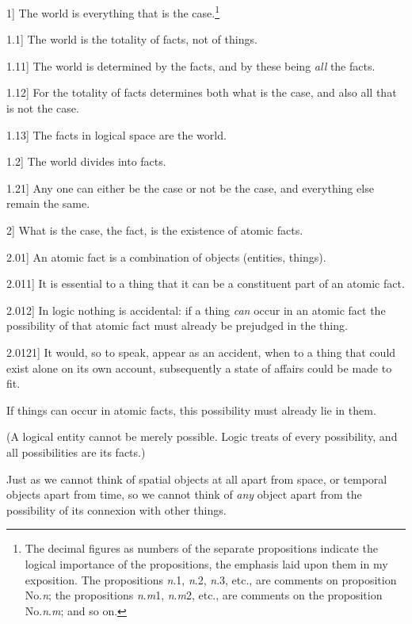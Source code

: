 \documentclass[12pt,oneside]{book}[2007/10/19]
\newcommand{\PropositionE}[2]{%
  \item[\phantomsection\label{PropE:#1}\PropGRef{#1}] #2%
}
\newcommand{\PropGRef}[1]{\hyperref[PropG:#1]{#1}}
\begin{document}
\begin{propositions}
\PropositionE{1}
{The world is everything that is the case.\footnote{The decimal figures as numbers of the separate propositions indicate the logical
importance of the propositions, the emphasis laid upon them in my exposition.
The propositions \textit{n}.1, \textit{n}.2, \textit{n}.3, etc., are comments on proposition No.\;\textit{n}; the propositions
\textit{n}.\textit{m}1, \textit{n}.\textit{m}2, etc., are comments on the proposition No.\;\textit{n}.\textit{m}; and so on.}}


\PropositionE{1.1}
{The world is the totality of facts, not of
things.}


\PropositionE{1.11}
{The world is determined by the facts, and by
these being \emph{all} the facts.}


\PropositionE{1.12}
{For the totality of facts determines both what is
the case, and also all that is not the case.}


\PropositionE{1.13}
{The facts in logical space are the world.}


\PropositionE{1.2}
{The world divides into facts.}


\PropositionE{1.21}
{Any one can either be the case or not be the
case, and everything else remain the same.}


\PropositionE{2}
{What is the case, the fact, is the existence of
atomic facts.}


\PropositionE{2.01}
{An atomic fact is a combination of objects
(entities, things).}


\PropositionE{2.011}
{It is essential to a thing that it can be a constituent
part of an atomic fact.}


\PropositionE{2.012}
{In logic nothing is accidental: if a thing \emph{can}
occur in an atomic fact the possibility of that
atomic fact must already be prejudged in the
thing.}


\PropositionE{2.0121}
{It would, so to speak, appear as an accident, when
to a thing that could exist alone on its own account,
subsequently a state of affairs could be made to fit.

If things can occur in atomic facts, this possibility
must already lie in them.

(A logical entity cannot be merely possible.
Logic treats of every possibility, and all possibilities
are its facts.)

Just as we cannot think of spatial objects at
all apart from space, or temporal objects apart
from time, so we cannot think of \emph{any} object apart
from the possibility of its connexion with other
things.

}
\end{propositions}
\end{document}
